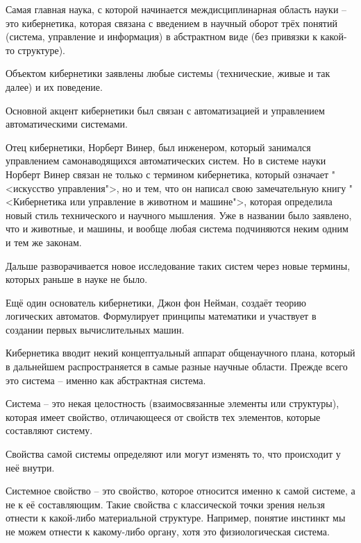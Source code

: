 \documentclass[main.tex]{subfiles}
\begin{document}


Самая главная наука, с которой начинается междисциплинарная область науки -- это кибернетика, которая связана с введением в научный оборот трёх понятий (система, управление и информация) в абстрактном виде (без привязки к какой-то структуре).

Объектом кибернетики заявлены любые системы (технические, живые и так далее) и их поведение.

Основной акцент кибернетики был связан с автоматизацией и управлением автоматическими системами.



Отец кибернетики, Норберт Винер, был инженером, который занимался управлением самонаводящихся автоматических систем.
Но в системе науки Норберт Винер связан не только с термином кибернетика, который означает "<искусство управления">, но и тем, что он написал свою замечательную книгу "<Кибернетика или управление в животном и машине">, которая определила новый стиль технического и научного мышления.
Уже в названии было заявлено, что и животные, и машины, и вообще любая система подчиняются неким одним и тем же законам.

Дальше разворачивается новое исследование таких систем через новые термины, которых раньше в науке не было.

Ещё один основатель кибернетики, Джон фон Нейман, создаёт теорию логических автоматов.
Формулирует принципы математики и участвует в создании первых вычислительных машин. 



Кибернетика вводит некий концептуальный аппарат общенаучного плана, который в дальнейшем распространяется в самые разные научные области.
Прежде всего это система -- именно как абстрактная система.

Система -- это некая целостность (взаимосвязанные элементы или структуры), которая имеет свойство, отличающееся от свойств тех элементов, которые составляют систему.

Свойства самой системы определяют или могут изменять то, что происходит у неё внутри.

Системное свойство -- это свойство, которое относится именно к самой системе, а не к её составляющим.
Такие свойства с классической точки зрения нельзя отнести к какой-либо материальной структуре.
Например, понятие инстинкт мы не можем отнести к какому-либо органу, хотя это физиологическая система.
\end{document}
